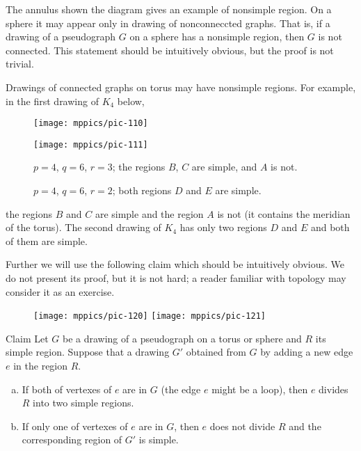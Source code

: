 The annulus shown the diagram gives an example of nonsimple region.
On a sphere it may appear only in drawing of nonconneccted graphs.
That is, if a drawing of a pseudograph $G$ on a sphere has a nonsimple region, then $G$ is not connected.
This statement should be intuitively obvious, but the proof is not trivial.  

Drawings of connected graphs on torus may have nonsimple regions.
For example, in the first drawing of $K_4$ below,
\begin{figure}[h!]
\begin{minipage}{.45\textwidth}
\centering
\texttt{[image: mppics/pic-110]}
\end{minipage}
\hfill
\begin{minipage}{.45\textwidth}
\centering
\texttt{[image: mppics/pic-111]}
\end{minipage}

\medskip

\begin{minipage}{.45\textwidth}
\centering
\caption*{$p=4$, $q=6$, $r=3$; the regions $B$, $C$ are simple, and $A$ is not.}
\end{minipage}\hfill
\begin{minipage}{.45\textwidth}
\centering
\caption*{$p=4$, $q=6$, $r=2$; both regions $D$ and $E$ are simple.}
\end{minipage}
\vskip-4mm
\end{figure} 
the regions $B$ and $C$ are simple and the region $A$ is not (it contains the meridian of the torus).
The second drawing of $K_4$ has only two regions $D$ and $E$ and both of them are simple.


Further we will use the following claim which should be intuitively obvious.
We do not present its proof, but it is not hard;
a reader familiar with topology may consider it as an exercise.

{

\begin{wrapfigure}{r}{15 mm}
\vskip-4mm
\centering
\texttt{[image: mppics/pic-120]}
\medskip
\texttt{[image: mppics/pic-121]}
\end{wrapfigure}

\begin{thm}{Claim}\label{clm:cut}
Let $G$ be a drawing of a pseudograph on a torus or sphere and $R$ its simple region.
Suppose that a drawing $G'$ obtained from $G$ by adding a new edge $e$ in the region $R$.
\begin{enumerate}[(a)]
\item If both of vertexes of $e$ are in $G$ (the edge $e$ might be a loop), then $e$ divides $R$ into two simple regions.
\item If only one of vertexes of $e$ are in $G$, then $e$ does not divide $R$ and the corresponding region of $G'$ is simple.
\end{enumerate}
\end{thm}

}


